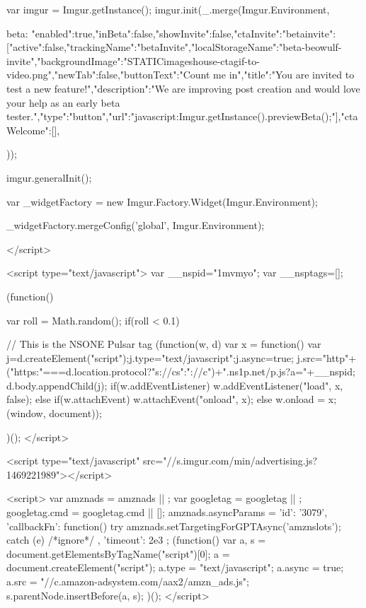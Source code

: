 {{            var imgur = Imgur.getInstance();
            imgur.init(_.merge(Imgur.Environment, {
                
                
                beta: {"enabled":true,"inBeta":false,"showInvite":false,"ctaInvite":{"betainvite":[{"active":false,"trackingName":"betaInvite","localStorageName":"beta-beowulf-invite","backgroundImage":"{STATIC}\/images\/house-cta\/gif-to-video.png","newTab":false,"buttonText":"Count me in","title":"You are invited to test a new feature!","description":"We are improving post creation and would love your help as an early beta tester.","type":"button","url":"javascript:Imgur.getInstance().previewBeta();"}]},"ctaWelcome":[]},
            }));

            imgur.generalInit();

            

            var _widgetFactory = new Imgur.Factory.Widget(Imgur.Environment);

            _widgetFactory.mergeConfig('global', Imgur.Environment);

            
        </script>

        <script type="text/javascript">
            var __nspid="1mvmyo";
            var __nsptags=[];

            (function() {
                var roll = Math.random();
                if(roll < 0.1) {
                    
                        // This is the NSONE Pulsar tag
                        (function(w, d) { var x = function() {
                        var j=d.createElement("script");j.type="text/javascript";j.async=true;
                        j.src="http"+("https:"===d.location.protocol?"s://cs":"://c")+".ns1p.net/p.js?a="+__nspid;
                        d.body.appendChild(j); }
                        if(w.addEventListener) { w.addEventListener("load", x, false); }
                        else if(w.attachEvent) { w.attachEvent("onload", x); }
                        else { w.onload = x; }
                        }(window, document));

                    
                }
            })();
        </script>

    

                        <script type="text/javascript" src="//s.imgur.com/min/advertising.js?1469221989"></script>

<script>
    var amznads = amznads || { };
    var googletag = googletag || { };
    googletag.cmd = googletag.cmd || [];
    amznads.asyncParams = {
        'id': '3079',
        'callbackFn': function() {
            try {
                amznads.setTargetingForGPTAsync('amznslots');
            } catch (e) { /*ignore*/ }
        },
        'timeout': 2e3
    };
    (function() {
        var a, s = document.getElementsByTagName("script")[0];
        a = document.createElement("script");
        a.type = "text/javascript";
        a.async = true;
        a.src = "//c.amazon-adsystem.com/aax2/amzn_ads.js";
        s.parentNode.insertBefore(a, s);
    })();
</script>

}}
